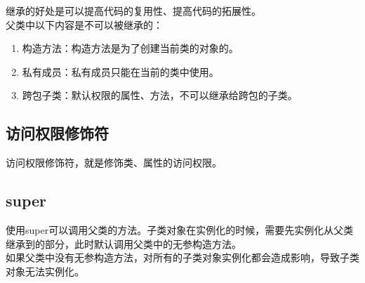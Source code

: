继承的好处是可以提高代码的复用性、提高代码的拓展性。 \\

父类中以下内容是不可以被继承的：

\begin{enumerate}
	\item 构造方法：构造方法是为了创建当前类的对象的。
	\item 私有成员：私有成员只能在当前的类中使用。
	\item 跨包子类：默认权限的属性、方法，不可以继承给跨包的子类。
\end{enumerate}

\subsection{访问权限修饰符}

访问权限修饰符，就是修饰类、属性的访问权限。

\begin{table}[H]
	\centering
	\caption{访问权限修饰符}
\end{table}

\subsection{super}

使用super可以调用父类的方法。子类对象在实例化的时候，需要先实例化从父类继承到的部分，此时默认调用父类中的无参构造方法。 \\

如果父类中没有无参构造方法，对所有的子类对象实例化都会造成影响，导致子类对象无法实例化。 \\

